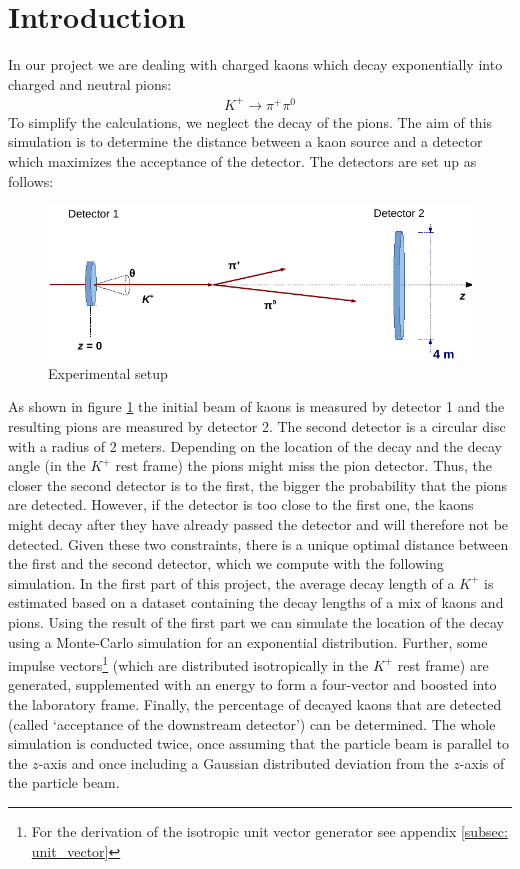 \documentclass[12pt,a4paper,oneside,english]{article}
\begin{document}
\section{Introduction}
In our project we are dealing with charged kaons which decay exponentially into charged and neutral pions:
\begin{align*}
K^+ \longrightarrow \pi^+ \pi^0
\end{align*}
To simplify the calculations, we neglect the decay of the pions. The aim of this simulation is to determine the distance between a kaon source and a detector which maximizes the acceptance of the detector. The detectors are set up as follows:
\begin{figure}[H]
	\centering
	\includegraphics[]{images/setup.pdf}
	\caption{Experimental setup}
	\label{fig:setup}
\end{figure}
As shown in figure \ref{fig:setup} the initial beam of kaons is measured by detector 1 and the resulting pions are measured by detector 2. The second detector is a circular disc with a radius of 2 meters. Depending on 
the location of the decay and
the decay angle (in the $K^+$ rest frame)
the pions might miss the pion detector. Thus, the closer the second detector is to the first, the bigger the probability that the pions are detected. However, if the detector is too close to the first one, the kaons might decay after they have already passed the detector and will therefore not be detected. Given these two constraints, there is a unique optimal distance between the first and the second detector, which we compute with the following simulation. 
In the first part of this project, the average decay length of a $K^+$ is estimated based on a dataset containing the decay lengths of a mix of kaons and pions. Using the result of the first part we can simulate the location of the decay using a Monte-Carlo simulation for an exponential distribution. Further, some impulse vectors\footnote{For the derivation of the isotropic unit vector generator see appendix \ref{subsec: unit_vector}} (which are distributed isotropically in the $K^+$ rest frame) are generated, supplemented with an energy to form a four-vector and boosted into the laboratory frame. Finally, the percentage of decayed kaons that are detected (called ‘acceptance of the downstream detector’) can be determined. 
The whole simulation is conducted twice, once assuming that the particle beam is parallel to the $z$-axis and once including a Gaussian distributed deviation from the $z$-axis of the particle beam. 
\end{document}
